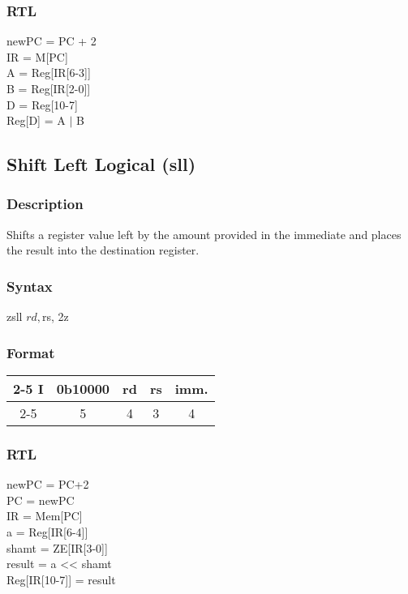 \documentclass[12pt, a4paper]{report}
\begin{document}
	\subsubsection{RTL}
	newPC = PC + 2 \\
	IR = M[PC] \\
	A = Reg[IR[6-3]] \\
	B = Reg[IR[2-0]] \\
	D = Reg[10-7] \\
	Reg[D] = A $|$ B \\
	
	\subsection{Shift Left Logical (sll)}
	\subsubsection{Description}
	Shifts a register value left by the amount provided in the immediate and places the result into the destination register.
	\subsubsection{Syntax}
	zsll    $rd, $rs, 2z %
	\subsubsection{Format}
	\begin{center}
		{\renewcommand{\arraystretch}{1.5}
			\begin{tabular}[b]{c @{ } c | c | c | c|}
				\cline{2-5}
				I & \vline \hspace{1.5pt} 0b10000 & rd & rs & imm. \\
				\cline{2-5}
				\multicolumn{1}{}{} & \multicolumn{1}{c}{5} & \multicolumn{1}{c}{4}
				& \multicolumn{1}{c}{3} & \multicolumn{1}{c}{4}
			\end{tabular}}
	\end{center}
	\subsubsection{RTL}
	newPC = PC+2 \\
	PC = newPC \\
	IR = Mem[PC] \\
	a = Reg[IR[6-4]] \\
	shamt = ZE[IR[3-0]] \\
	result = a << shamt \\
	Reg[IR[10-7]] = result \\
	
\end{document}
